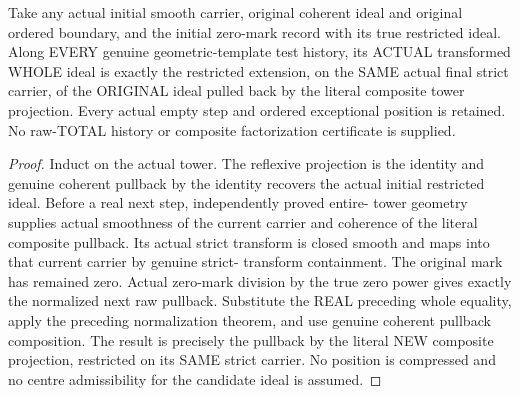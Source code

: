 \begin{theorem}
\label{hir:sharp-actual-original-zero-history-composite-total}
\leanok
Take any actual initial smooth carrier, original coherent ideal and
original ordered boundary, and the initial zero-mark record with its true
restricted ideal. Along EVERY genuine geometric-template test history,
its ACTUAL transformed WHOLE ideal is exactly the restricted extension,
on the SAME actual final strict carrier, of the ORIGINAL ideal pulled
back by the literal composite tower projection. Every actual empty step
and ordered exceptional position is retained. No raw-TOTAL history or
composite factorization certificate is supplied.
\end{theorem}
\begin{proof}
Induct on the actual tower. The reflexive projection is the identity and
genuine coherent pullback by the identity recovers the actual initial
restricted ideal. Before a real next step, independently proved entire-
tower geometry supplies actual smoothness of the current carrier and
coherence of the literal composite pullback. Its actual strict transform
is closed smooth and maps into that current carrier by genuine strict-
transform containment. The original mark has remained zero. Actual
zero-mark division by the true zero power gives exactly the normalized
next raw pullback. Substitute the REAL preceding whole equality, apply
the preceding normalization theorem, and use genuine coherent pullback
composition. The result is precisely the pullback by the literal NEW
composite projection, restricted on its SAME strict carrier. No position
is compressed and no centre admissibility for the candidate ideal is
assumed.
\end{proof}


